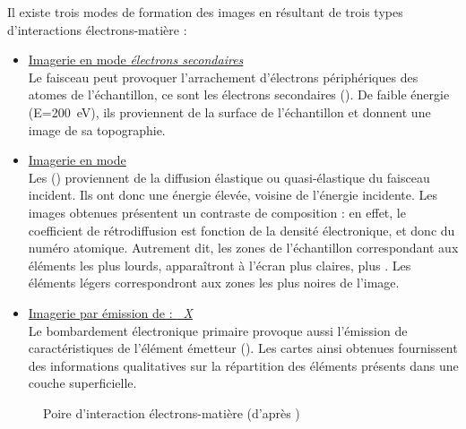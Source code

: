 Il existe trois modes de formation des images en \MEB[ie] résultant 
de trois types d'interactions électrons-matière :

\begin{itemize}
  \item \uline{Imagerie en mode \emph{électrons secondaires}}\\
        Le faisceau peut provoquer l'arrachement d'électrons 
        périphériques des atomes de l'échantillon, ce sont les 
        électrons secondaires (). De faible énergie 
        (E=\SI{200}{\electronvolt}), ils proviennent de la surface 
        de l'échantillon et donnent une image de sa topographie. 
  \item \uline{Imagerie en mode \emph{\ERD}}\\ 
        Les \ERD () proviennent de la diffusion 
        élastique ou quasi-élastique du faisceau incident. Ils ont 
        donc une énergie élevée, voisine de l'énergie incidente. 
        Les images obtenues présentent un contraste de composition : 
        en effet, le coefficient de rétrodiffusion est fonction de 
        la densité électronique, et donc du numéro atomique. 
        Autrement dit, les zones de l'échantillon correspondant aux 
        éléments les plus lourds, apparaîtront à l'écran plus claires, 
        plus . Les éléments légers correspondront 
        aux zones les plus noires de l'image.
  \item \uline{Imagerie par émission de \RX : \emph{\carto~X}}\\
        Le bombardement électronique primaire provoque aussi 
        l'émission de \RX caractéristiques de l'élément émetteur 
        (). Les cartes ainsi obtenues fournissent des 
        informations qualitatives sur la répartition des éléments 
        présents dans une couche superficielle.
\end{itemize}

\begin{figure}[htb]
  \caption[Poire d'interaction électrons-matière]
          {Poire d'interaction électrons-matière 
           (d'après \cite{web_MEB})}
  \label{fig:meb}
\end{figure}

